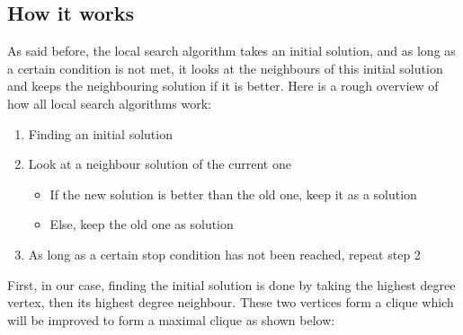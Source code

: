 
\subsection{How it works}

As said before, the local search algorithm takes an initial solution, and as long 
as a certain condition is not met, it looks at the neighbours of this initial solution 
and keeps the neighbouring solution if it is better. Here is a rough overview of 
how all local search algorithms work:

\begin{enumerate}
    \item Finding an initial solution
    \item Look at a neighbour solution of the current one
    \begin{itemize}
        \item If the new solution is better than the old one, keep it as a solution
        \item Else, keep the old one as solution
    \end{itemize}
    \item As long as a certain stop condition has not been reached, repeat step 2
\end{enumerate}

First, in our case, finding the initial solution is done by taking the highest 
degree vertex, then its highest degree neighbour. These two vertices form a 
clique which will be improved to form a maximal clique as shown below:

